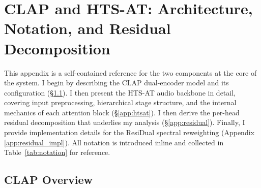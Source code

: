 
\section{CLAP and HTS-AT: Architecture, Notation, and Residual Decomposition}
\label{app:architecture}

This appendix is a self-contained reference for the two components at the
core of the system. I begin by describing the CLAP dual-encoder model and
its configuration (\S\ref{app:clap_overview}). I then present the HTS-AT
audio backbone in detail, covering input preprocessing, hierarchical stage
structure, and the internal mechanics of each attention block
(\S\ref{app:htsat}). I then derive the per-head residual decomposition
that underlies my analysis (\S\ref{app:residual}). Finally, I provide
implementation details for the ResiDual spectral reweighting
(Appendix \ref{app:residual_impl}). All notation is introduced inline and
collected in Table~\ref{tab:notation} for reference.

\subsection{CLAP Overview}
\label{app:clap_overview}

